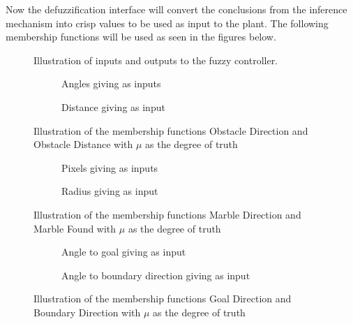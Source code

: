 \documentclass[../Head/Main.tex]{subfiles}
\begin{document}
Now the defuzzification interface will convert the conclusions from the inference mechanism into crisp values to be used as input to the plant. The following membership functions will be used as seen in the figures below.  


\begin{figure}[H]
	\centering
	
	\caption{Illustration of inputs and outputs to the fuzzy controller.}
	\label{fig:MSF_Overview}
\end{figure}

\begin{figure}[H]
	\centering
	\begin{subfigure}[b]{0.49\textwidth}
		\centering
		
		\caption{Angles giving as inputs}
		\label{fig:MSF_Obstacle_direction}
	\end{subfigure}
	\hfill
	\begin{subfigure}[b]{0.49\textwidth}
		
		\vspace{-17pt}
		\caption{Distance giving as input}
		\label{fig:MSF_Obstacle_distance}
	\end{subfigure}
	\caption{Illustration of the membership functions Obstacle Direction and Obstacle Distance with $\mu$ as the degree of truth}
	\label{fig:MSF_Obstacle_dir_dis}
\end{figure}

\begin{figure}[H]
	\centering
	\begin{subfigure}[b]{0.49\textwidth}
		\centering
		
		\caption{Pixels giving as inputs }
		\label{fig:MSF_Marble_direction}
	\end{subfigure}
	\hfill
	\begin{subfigure}[b]{0.49\textwidth}
		
		\caption{Radius giving as input}
		\label{fig:MSF_Marble_found}
	\end{subfigure}
	\caption{Illustration of the membership functions Marble Direction and Marble Found with $\mu$ as the degree of truth}
	\label{fig:MSF_Marble}
\end{figure}

\begin{figure}[H]
	\centering
	\begin{subfigure}[b]{0.49\textwidth}
		\centering
		
		\caption{Angle to goal giving as input}
		\label{fig:MSF_Goal_direction}
	\end{subfigure}
	\hfill
	\begin{subfigure}[b]{0.49\textwidth}
		
		\caption{Angle to boundary direction giving as input}
		\label{fig:MSF_Boundary_direction}
	\end{subfigure}
	\caption{Illustration of the membership functions Goal Direction and Boundary Direction with $\mu$ as the degree of truth}
	\label{fig:MSF_Goal_boundary}
\end{figure}
\end{document}
